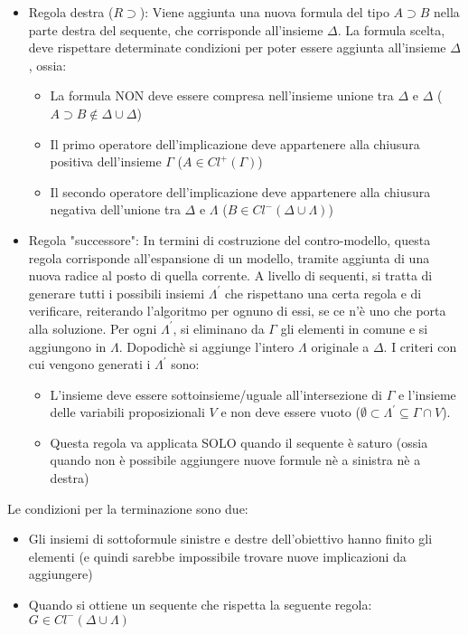 \documentclass[\main/tesi.tex]{subfiles}
\begin{document}
\begin{itemize}
\begin{itemize}
\begin{itemize}
                    \end{itemize}
              \item Regola destra ($R\supset$): Viene aggiunta una nuova formula del tipo $A \supset B$ nella parte destra del sequente, che corrisponde all'insieme $\Delta$. La formula scelta, deve rispettare determinate condizioni per poter essere aggiunta all'insieme $\Delta$, ossia:
                    \begin{itemize}
                        \item La formula NON deve essere compresa nell'insieme unione tra $\Delta$ e $\Delta$ ($A \supset B \notin \Delta \cup \Delta$)
                        \item Il primo operatore dell'implicazione deve appartenere alla chiusura positiva dell'insieme $\Gamma$ ($A \in Cl^{+}(\Gamma)$)
                        \item Il secondo operatore dell'implicazione deve appartenere alla chiusura negativa dell'unione tra $\Delta$ e $\Lambda$ ($B \in Cl^{-}(\Delta \cup \Lambda)$)
                    \end{itemize}
              \item Regola "successore": In termini di costruzione del contro-modello, questa regola corrisponde all'espansione di un modello, tramite aggiunta di una nuova radice al posto di quella corrente. A livello di sequenti, si tratta di generare tutti i possibili insiemi $\Lambda^{'}$ che rispettano una certa regola e di verificare, reiterando l'algoritmo per ognuno di essi, se ce n'è uno che porta alla soluzione. Per ogni $\Lambda^{'}$, si eliminano da $\Gamma$ gli elementi in comune e si aggiungono in $\Lambda$. Dopodichè si aggiunge l'intero $\Lambda$ originale a $\Delta$. I criteri con cui vengono generati i $\Lambda^{'}$ sono:
                    \begin{itemize}
                        \item L'insieme deve essere sottoinsieme/uguale all'intersezione di $\Gamma$ e l'insieme delle variabili proposizionali $V$ e non deve essere vuoto ($\emptyset \subset \Lambda^{'} \subseteq \Gamma \cap V$).
                        \item Questa regola va applicata SOLO quando il sequente è saturo (ossia quando non è possibile aggiungere nuove formule nè a sinistra nè a destra)
                    \end{itemize}
          \end{itemize}
\end{itemize}

Le condizioni per la terminazione sono due:
\begin{itemize}
    \item Gli insiemi di sottoformule sinistre e destre dell'obiettivo hanno finito gli elementi (e quindi sarebbe impossibile trovare nuove implicazioni da aggiungere)
    \item Quando si ottiene un sequente che rispetta la seguente regola: $G \in Cl^{-}(\Delta \cup \Lambda)$
\end{itemize}
\end{document}
